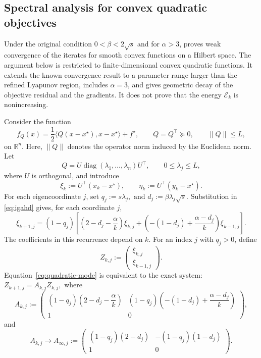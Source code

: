\documentclass[11pt]{article}
\theoremstyle{plain}
\theoremstyle{definition}
\newcommand{\R}{\mathbb{R}}
\newcommand{\norm}[1]{\left\lVert #1\right\rVert}
\begin{document}
{
\subsection{Spectral analysis for convex quadratic objectives}
\label{subsec:quadratic}

{Under the original condition $0<\beta<2\sqrt{s}$ and for
$\alpha>3$, \cite[Theorem~4.3]{ACFR2023} proves weak convergence of the
iterates for smooth convex functions on a Hilbert space. The argument below is
restricted to finite-dimensional convex quadratic functions. It extends the
known convergence result to a parameter range larger than the refined
Lyapunov region, includes $\alpha=3$, and gives geometric decay of the
objective residual and the gradients. It does not prove that the energy
$\mathcal E_k$ is nonincreasing.}

Consider the function
$$
f_Q(x)=\frac12\langle Q(x-x^\star),x-x^\star\rangle+f^\star,
\qquad
Q=Q^\top\succeq0,
\qquad
\norm{Q}\leq L,
$$
on $\R^n$. Here, $\norm{Q}$ denotes the operator norm induced by the Euclidean norm. Let
$$
Q=U\operatorname{diag}(\lambda_1,\ldots,\lambda_n)U^\top,
\qquad
0\leq\lambda_j\leq L,
$$
where $U$ is orthogonal, and introduce
$$
\xi_k:=U^\top(x_k-x^\star),
\qquad
\eta_k:=U^\top(y_k-x^\star).
$$
For each eigencoordinate $j$, set $q_j:=s\lambda_j, \mbox{ and }d_j:=\beta\lambda_j\sqrt{s}.$
Substitution in \eqref{eq:igahd} gives, for each coordinate $j$,
\begin{equation}
\label{eq:quadratic-mode}
\xi_{k+1,j}=(1-q_j)
\left[
\left(2-d_j-\frac{\alpha}{k}\right)\xi_{k,j}
+\left(-(1-d_j)+\frac{\alpha-d_j}{k}\right)\xi_{k-1,j}
\right].
\end{equation}
The coefficients in this recurrence depend on $k$.
For an index $j$ with $q_j>0$, define
$$
Z_{k,j}:=
\begin{pmatrix}
\xi_{k,j}\\
\xi_{k-1,j}
\end{pmatrix}.
$$
Equation~\eqref{eq:quadratic-mode} is equivalent to the exact system: $
Z_{k+1,j}=A_{k,j}Z_{k,j},$
where
$$
A_{k,j}:=
\begin{pmatrix}
(1-q_j)\left(2-d_j-\dfrac{\alpha}{k}\right)
&
(1-q_j)\left(-(1-d_j)+\dfrac{\alpha-d_j}{k}\right)\\
1&0
\end{pmatrix},
$$
and
$$
A_{k,j}\longrightarrow
A_{\infty,j}:=
\begin{pmatrix}
(1-q_j)(2-d_j)&-(1-q_j)(1-d_j)\\
1&0
\end{pmatrix}.
$$}
\end{document}
